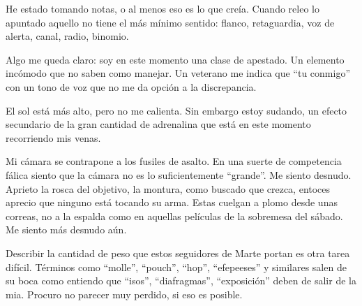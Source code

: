 \documentclass[12pt,a4paper,twoside,twocolumn,final]{article}
\begin{document}
	He estado tomando notas, o al menos eso es lo que cre\'ia. Cuando releo lo apuntado aquello no tiene el m\'as m\'inimo sentido: flanco, retaguardia, voz de alerta, canal, radio, binomio.
	
	Algo me queda claro: soy en este momento una clase de apestado. Un elemento inc\'omodo que no saben como manejar. Un veterano me indica que ``tu conmigo'' con un tono de voz que no me da opci\'on a la discrepancia.
	
	El sol est\'a m\'as alto, pero no me calienta. Sin embargo estoy sudando, un efecto secundario de la gran cantidad de adrenalina que est\'a en este momento recorriendo mis venas.
	
	Mi c\'amara se contrapone a los fusiles de asalto. En una suerte de competencia f\'alica siento que la c\'amara no es lo suficientemente ``grande''. Me siento desnudo. Aprieto la rosca del objetivo, la montura, como buscado que crezca, entoces aprecio que ninguno est\'a tocando su arma. Estas cuelgan a plomo desde unas correas, no a la espalda como en aquellas pel\'iculas de la sobremesa del s\'abado. Me siento m\'as desnudo a\'un.
	
	Describir la cantidad de peso que estos seguidores de Marte portan es otra tarea dif\'icil. T\'erminos como ``molle'', ``pouch'', ``hop'', ``efepeeses'' y similares salen de su boca como entiendo que ``isos'', ``diafragmas'', ``exposici\'on'' deben de salir de la mia. Procuro no parecer muy perdido, si eso es posible.
	
	
	
\end{document}
